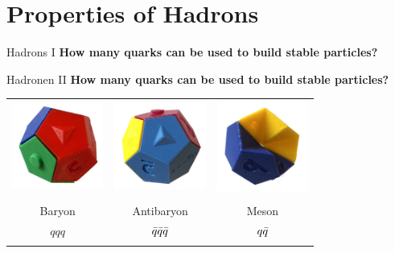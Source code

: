 \section{Properties of Hadrons}
\begin{frame}{Hadrons I}
     \hspace{0.2cm} \textbf{How many quarks can be used to build stable particles?} \\
    \end{frame}
 \begin{frame}{Hadronen II}
 \textbf{How many quarks can be used to build stable particles?}
\begin{table}[]
    \centering
    \begin{tabular}{ccc}
        \includegraphics[width=3cm]{Figures Lecture on Hadrons/QuarkPuzzle_Baryon.jpg}&\includegraphics[width=3cm]{Figures Lecture on Hadrons/QuarkPuzzle_Antibaryon.jpg}&\includegraphics[width=3cm]{Figures Lecture on Hadrons/QuarkPuzzle_Meson.jpg} \\
        &&\\
        Baryon &   Antibaryon  & Meson    \\
        $qqq$ &  $\Bar{q}\Bar{q}\Bar{q} $&$ q\Bar{q}$ \\
        &&\\

\end{tabular}
\end{table}
\end{frame}
